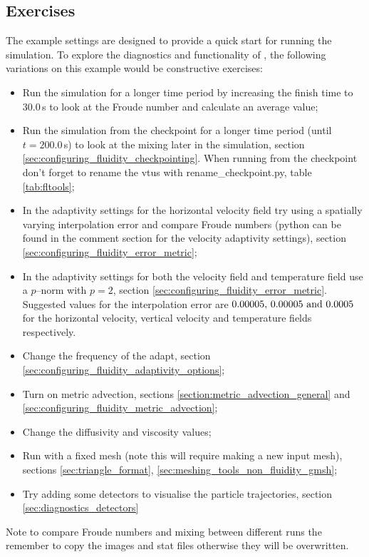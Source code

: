 \subsection{Exercises}
\label{sec:le_exercises}
The example settings are designed to provide a quick start for running the simulation. To explore the diagnostics and functionality of \fluidity, the following variations on this example would be constructive exercises:
\begin{itemize}
\item Run the simulation for a longer time period by increasing the finish time to $30.0\,$s to look at the Froude number and calculate an average value;
\item Run the simulation from the checkpoint for a longer time period (until $t=200.0\,$s) to look at the mixing later in the simulation, section \ref{sec:configuring_fluidity_checkpointing}. When running from the checkpoint don't forget to rename the vtus with rename\_checkpoint.py, table \ref{tab:fltools};
\item In the adaptivity settings for the horizontal velocity field try using a spatially varying interpolation error and compare Froude numbers (python can be found in the comment section for the velocity adaptivity settings), section \ref{sec:configuring_fluidity_error_metric};
\item In the adaptivity settings for both the velocity field and temperature field use a $p$--norm with \mbox{$p=2$}, section \ref{sec:configuring_fluidity_error_metric}. Suggested values for the interpolation error are $0.00005, \, 0.00005 \,\, {\rm and} \,\, 0.0005$ for the horizontal velocity, vertical velocity and temperature fields respectively. 
\item Change the frequency of the adapt, section \ref{sec:configuring_fluidity_adaptivity_options};
\item Turn on metric advection, sections \ref{section:metric_advection_general} and \ref{sec:configuring_fluidity_metric_advection};
\item Change the diffusivity and viscosity values;
\item Run with a fixed mesh (note this will require making a new input mesh), sections \ref{sec:triangle_format}, \ref{sec:meshing_tools_non_fluidity_gmsh};
\item Try adding some detectors to visualise the particle trajectories, section \ref{sec:diagnostics_detectors} %
\end{itemize}
Note to compare Froude numbers and mixing between different runs the remember to copy the images and stat files otherwise they will be overwritten.

